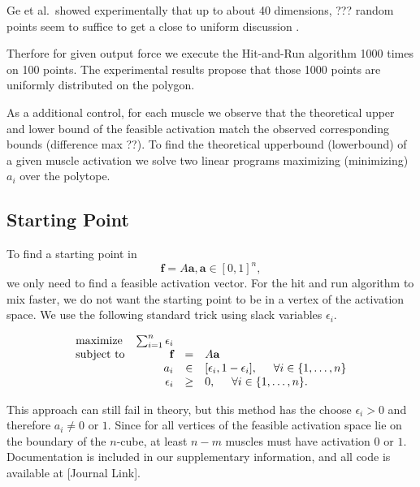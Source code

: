 Ge et al.\ showed experimentally that up to about 40 dimensions, ??? random points seem to suffice to get a close to uniform discussion \cite{Ge}. 

Therfore for given output force we execute the Hit-and-Run algorithm 1000 times on 100 points. The experimental results propose that those 1000 points are uniformly distributed on the polygon.

As a additional control, for each muscle we observe that the theoretical upper and lower bound of the feasible activation match the observed corresponding bounds (difference max ??). To find the theoretical upperbound (lowerbound) of a given muscle activation we solve two linear programs maximizing (minimizing)  $a_i$ over the polytope.



\subsection{Starting Point}
To find a starting point in 
\[\textbf{f} = A\textbf{a}, \textbf{a} \in [0,1]^n,\]
we only need to find a feasible activation vector. For the hit and run algorithm to mix faster, we do not want the starting point to be in a vertex of the activation space. We use the following standard trick using slack variables $\epsilon_i$.

\begin{equation}\label{eq:LP_r}
\begin{array}{lrcl}
\mbox{maximize} & \sum_{i=1}^n \epsilon_i \\ 
\mbox{subject to} & \textbf{f} &=& A\textbf{a}\\
  & a_i &\in& [\epsilon_i, 1- \epsilon_i], \hspace{5mm} \forall i \in \{1,\dots,n\}  \\
  & \epsilon_i &\geq& 0, \hspace{5mm} \forall i \in \{1,\dots,n\}.  
\end{array}
\end{equation}

This approach can still fail in theory, but this method has the choose $\epsilon_i > 0$ and therefore $a_i \neq 0$ or $1$. Since for all vertices of the feasible activation space lie on the boundary of the $n$-cube, at least $n-m$ muscles must have activation $0$ or $1$. Documentation is included in our supplementary information, and all code is available at [Journal Link].

